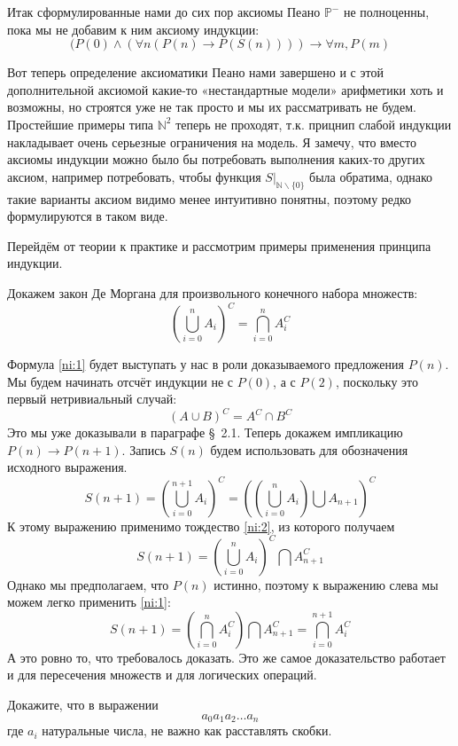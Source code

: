 Итак сформулированные нами до сих пор аксиомы Пеано $\mathbb{P}^-$ не полноценны, пока мы не добавим к ним аксиому индукции:
$$(P(0)\land(\forall n (P(n)\to P(S(n)))) \to \forall m, P(m)$$

Вот теперь определение аксиоматики Пеано нами завершено и с этой дополнительной аксиомой какие-то «нестандартные модели» арифметики хоть и возможны, но строятся уже не так просто и мы их рассматривать не будем. Простейшие примеры типа $\mathbb{N}^2$ теперь не проходят, т.к. прицнип слабой индукции накладывает очень серьезные ограничения на модель. Я замечу, что вместо аксиомы индукции можно было бы потребовать выполнения каких-то других аксиом, например потребовать, чтобы функция $S|_{\mathbb{N}\backslash\{0\}}$ была обратима, однако такие варианты аксиом видимо менее интуитивно понятны, поэтому редко формулируются в таком виде.

Перейдём от теории к практике и рассмотрим примеры применения принципа индукции.

\begin{example}
Докажем закон Де Моргана для произвольного конечного набора множеств:
\begin{equation}\label{ni:1}
\left(\bigcup_{i=0}^n A_i\right)^C = \bigcap_{i=0}^n A_i^C
\end{equation}
\end{example}

Формула \eqref{ni:1} будет выступать у нас в роли доказываемого предложения $P(n)$. Мы будем начинать отсчёт индукции не с $P(0)$, а с $P(2)$, поскольку это первый нетривиальный случай:
\begin{equation}\label{ni:2}
(A\cup B)^C = A^C \cap B^C
\end{equation}
Это мы уже доказывали в параграфе \S~2.1. Теперь докажем импликацию $P(n)\to P(n + 1)$. Запись $S(n)$ будем использовать для обозначения исходного выражения.
$$S(n+1) = \left( \bigcup_{i=0}^{n+1} A_i \right)^C = \left( \left( \bigcup_{i=0}^n A_i\right) \bigcup A_{n+1}\right)^C$$
К этому выражению применимо тождество \eqref{ni:2}, из которого получаем
$$S(n+1) = \left( \bigcup_{i=0}^n A_i\right)^C \bigcap A_{n+1}^C$$
Однако мы предполагаем, что $P(n)$ истинно, поэтому к выражению слева мы можем легко применить \eqref{ni:1}:
$$S(n+1) = \left(\bigcap_{i=0}^n A_i^C\right) \bigcap A_{n+1}^C = \bigcap_{i=0}^{n+1} A_i^C$$
А это ровно то, что требовалось доказать. Это же самое доказательство работает и для пересечения множеств и для логических операций.

\begin{example}\label{ex:naturals_assoc}
Докажите, что в выражении
$$a_0 a_1 a_2 \ldots a_n$$
где $a_i$ натуральные числа, не важно как расставлять скобки.
\end{example}

